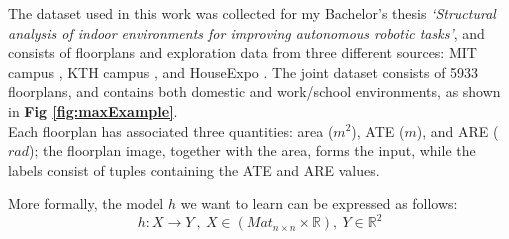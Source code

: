 \noindent
The dataset used in this work was collected for my Bachelor's thesis \textit{`Structural analysis of indoor environments for improving autonomous robotic tasks'}, and consists of floorplans and exploration data from three different sources: MIT campus \cite{whiting2006geometric}, KTH campus \cite{aydemir2012KTH}, and HouseExpo \cite{li2019houseexpo}. 
The joint dataset consists of 5933 floorplans, and contains both domestic and work/school environments, as shown in \textbf{Fig \ref{fig:maxExample}}.\\

\noindent
Each floorplan has associated three quantities: area ($m^2$), ATE ($m$), and ARE ($rad$); the floorplan image, together with the area, forms the input, while the labels consist of tuples containing the ATE and ARE values.

\noindent
More formally, the model $h$ we want to learn can be expressed as follows:
$$
    h: X \rightarrow Y\ ,\ X\in (Mat_{n \times n}\times\mathbb{R}),\ Y\in\mathbb{R}^2 
$$